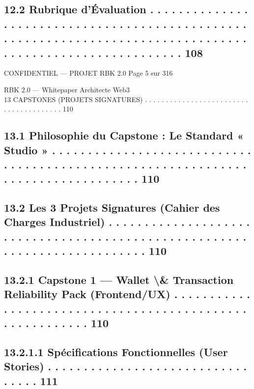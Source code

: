\subsection{12.2    Rubrique d’Évaluation . . . . . . . . . . . . . . . . . . . . . . . . . . . . . . . . . . . . . . . . . . . . . . . . . . . . . . . . . . . . . . . . . . . . . . . . . . . . . . . . . . . . . . . . . . . . . . . . . . . . . . . . . . . 108}
\vspace{0.5em}
\vspace{0.5em}
\vspace{0.5em}
\begin{confidential}CONFIDENTIEL — PROJET RBK 2.0                                                                                Page 5 sur 316\end{confidential}
RBK 2.0 — Whitepaper Architecte Web3\\
\vspace{0.5em}
\vspace{0.5em}
13    CAPSTONES (PROJETS SIGNATURES) . . . . . . . . . . . . . . . . . . . . . . . . . . . . . . . . . . . . . . . 110\\
\subsection{13.1    Philosophie du Capstone : Le Standard « Studio » . . . . . . . . . . . . . . . . . . . . . . . . . . . . . . . . . . . . . . . . . . . . . . . . . . . . . . . . . . . . . . . . . . . . . . . . . . . . . . . . . 110}
\subsection{13.2    Les 3 Projets Signatures (Cahier des Charges Industriel) . . . . . . . . . . . . . . . . . . . . . . . . . . . . . . . . . . . . . . . . . . . . . . . . . . . . . . . . . . . . . . . . . . . . . . . . . . 110}
\subsection{13.2.1            Capstone 1 — Wallet \textbackslash{}& Transaction Reliability Pack (Frontend/UX) . . . . . . . . . . . . . . . . . . . . . . . . . . . . . . . . . . . . . . . . . . . . . . . . . . . . . . . . . 110}
\subsection{13.2.1.1 Spécifications Fonctionnelles (User Stories) . . . . . . . . . . . . . . . . . . . . . . . . . . . . . . . . . 111}
